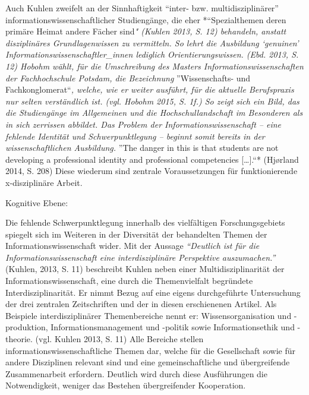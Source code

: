 \documentclass[a4paper,
fontsize=11pt,
oneside,
numbers=noperiodatend,
parskip=half-,
bibliography=totoc,
final
]{scrartcl}
\begin{document}
Auch Kuhlen zweifelt an der Sinnhaftigkeit \enquote{inter- bzw.
multidisziplinärer} informationswissenschaftlicher Studiengänge, die
eher *\enquote{Spezialthemen deren primäre Heimat andere Fächer
sind\emph{" (Kuhlen 2013, S. 12) behandeln, anstatt disziplinäres
Grundlagenwissen zu vermitteln. So lehrt die Ausbildung
\enquote{genuinen} Informationswissenschaftler\_innen lediglich
Orientierungswissen. (Ebd. 2013, S. 12) Hobohm wählt, für die
Umschreibung des Masters Informationswissenschaften der Fachhochschule
Potsdam, die Bezeichnung }}Wissenschafts- und
Fachkonglomerat\enquote{\emph{, welche, wie er weiter ausführt, für die
aktuelle Berufspraxis nur selten verständlich ist. (vgl. Hobohm 2015, S.
1f.) So zeigt sich ein Bild, das die Studiengänge im Allgemeinen und die
Hochschullandschaft im Besonderen als in sich zerrissen abbildet. Das
Problem der Informationswissenschaft -- eine fehlende Identität und
Schwerpunktlegung -- beginnt somit bereits in der wissenschaftlichen
Ausbildung. }}The danger in this is that students are not developing a
professional identity and professional competencies {[}\ldots{}{]}.``*
(Hjørland 2014, S. 208) Diese wiederum sind zentrale Voraussetzungen für
funktionierende x-disziplinäre Arbeit.

Kognitive Ebene:

Die fehlende Schwerpunktlegung innerhalb des vielfältigen
Forschungsgebiets spiegelt sich im Weiteren in der Diversität der
behandelten Themen der Informationswissenschaft wider. Mit der Aussage
\emph{\enquote{Deutlich ist für die Informationswissenschaft eine
interdisziplinäre Perspektive auszumachen.}} (Kuhlen, 2013, S. 11)
beschreibt Kuhlen neben einer Multidisziplinarität der
Informationswissenschaft, eine durch die Themenvielfalt begründete
Interdisziplinarität. Er nimmt Bezug auf eine eigens durchgeführte
Untersuchung der drei zentralen Zeitschriften und der in diesen
erschienenen Artikel. Als Beispiele interdisziplinärer Themenbereiche
nennt er: Wissensorganisation und -produktion, Informationsmanagement
und -politik sowie Informationsethik und -theorie. (vgl. Kuhlen 2013, S.
11) Alle Bereiche stellen informationswissenschaftliche Themen dar,
welche für die Gesellschaft sowie für andere Disziplinen relevant sind
und eine gemeinschaftliche und übergreifende Zusammenarbeit erfordern.
Deutlich wird durch diese Ausführungen die Notwendigkeit, weniger das
Bestehen übergreifender Kooperation.
\end{document}
